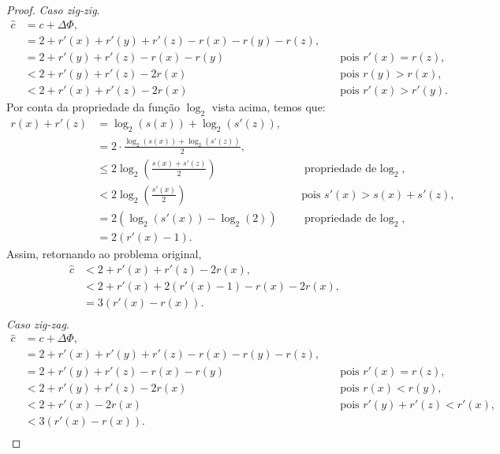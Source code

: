 \begin{proof}
    \textit{Caso zig-zig}.   
    \begin{align*}
        \hat{c} &= c + \Delta \Phi,\\
        &= 2 + r'(x) + r'(y) + r'(z) - r(x) - r(y) - r(z), \quad & \text{}\\
        &= 2 + r'(y) + r'(z) - r(x) - r(y) \quad & \text{pois $r'(x) = r(z)$},\\
        &< 2 + r'(y) + r'(z) - 2r(x) \quad & \text{pois $r(y) > r(x)$}, \\
        &< 2 + r'(x) + r'(z) - 2r(x) \quad & \text{pois $r'(x) > r'(y)$}.
    \end{align*}
    Por conta da propriedade da função $\log_2$ vista acima, temos que:
    \begin{align*}
        r(x) + r'(z) &= \log_2(s(x)) + \log_2(s'(z)), \quad & \text{}\\
        &= 2 \cdot \frac{\log_2(s(x)) + \log_2(s'(z))}{2}, \quad & \text{} \\
        &\leq 2 \log_2(\frac{s(x) + s'(z)}{2}) \quad & \text{propriedade de $\log_2$}, \\
        &< 2 \log_2(\frac{s'(x)}{2}) \quad & \text{pois $s'(x) > s(x) + s'(z)$}, \\
        &= 2 (\log_2(s'(x)) - \log_2(2)) \quad & \text{propriedade de $\log_2$}, \\
        &= 2 (r'(x) - 1).
    \end{align*}
    Assim, retornando ao problema original,
    \begin{align*}
        \hat{c} &< 2 + r'(x) + r'(z) - 2r(x), \\
        &< 2 + r'(x) +  2 (r'(x) - 1) - r(x) - 2r(x), \\
        &= 3(r'(x) - r(x)). \\
    \end{align*}
    \textit{Caso zig-zag}.   
    \begin{align*}
        \hat{c} &= c + \Delta \Phi,\\
        &= 2 + r'(x) + r'(y) + r'(z) - r(x) - r(y) - r(z), \quad & \text{}\\
        &= 2 + r'(y) + r'(z) - r(x) - r(y) \quad & \text{pois $r'(x) = r(z)$},\\
        &< 2 + r'(y) + r'(z) - 2r(x) \quad & \text{pois $r(x) < r(y)$},\\
        &< 2 + r'(x) - 2r(x) \quad & \text{pois $r'(y) + r'(z) < r'(x)$},\\
        &< 3(r'(x) - r(x)). \\
    \end{align*}
\end{proof}

